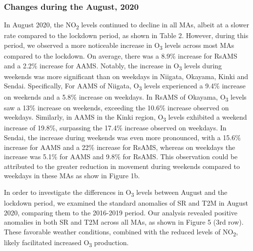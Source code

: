 \subsubsection*{Changes during the August, 2020}
In August 2020, the NO\textsubscript{2} levels continued to decline in all MAs, albeit at a slower rate compared to the lockdown period, as shown in Table 2. However, during this period, we observed a more noticeable increase in O\textsubscript{3} levels across most MAs compared to the lockdown. On average, there was a 8.9\% increase for RsAMS and a 2.2\% increase for AAMS. Notably, the increase in O\textsubscript{3} levels during weekends was more significant than on weekdays in Niigata, Okayama, Kinki and Sendai. Specifically, For AAMS of Niigata, O\textsubscript{3} levels experienced a 9.4\% increase on weekends and a 5.8\% increase on weekdays. In RsAMS of Okayama, O\textsubscript{3} levels saw a 13\% increase on weekends, exceeding the 10.6\% increase observed on weekdays. Similarly, in AAMS in the Kinki region, O\textsubscript{3} levels exhibited a weekend increase of 19.8\%, surpassing the 17.4\% increase observed on weekdays. In Sendai, the increase during weekends was even more pronounced, with a 15.6\% increase for AAMS and a 22\% increase for RsAMS, whereas on weekdays the increase was 5.1\% for AAMS and 9.8\% for RsAMS. This observation could be attributed to the greater reduction in movement during weekends compared to weekdays in these MAs as show in Figure 1b. \par
In order to investigate the differences in O\textsubscript{3} levels between August and the lockdown period, we examined the standard anomalies of SR and T2M in August 2020, comparing them to the 2016-2019 period. Our analysis revealed positive anomalies in both SR and T2M across all MAs, as shown in Figure 5 (3rd row). These favorable weather conditions, combined with the reduced levels of NO\textsubscript{2}, likely facilitated increased O\textsubscript{3} production. \par

